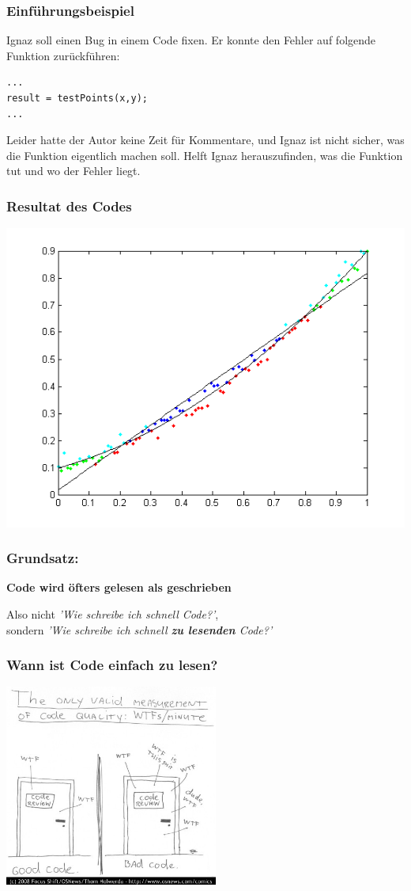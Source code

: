 \documentclass[handout]{beamer}
\begin{document}
\begin{frame}[fragile]
    \frametitle{Einführungsbeispiel}
    Ignaz soll einen Bug in einem Code fixen. Er konnte den Fehler auf folgende
    Funktion zurückführen:
\begin{lstlisting}
...
result = testPoints(x,y);
...
\end{lstlisting}
Leider hatte der Autor keine Zeit für Kommentare, und Ignaz ist nicht sicher,
was die Funktion eigentlich machen soll. Helft Ignaz herauszufinden,
was die Funktion  tut und wo der Fehler liegt.
\end{frame}

\begin{frame}
    \frametitle{Resultat des Codes}
    \begin{center}
        \includegraphics[width=0.8\linewidth]{GrafikResultat.png}
    \end{center}
\end{frame}


\begin{frame}
    \frametitle{Grundsatz:}
    \begin{center}
        \huge \bf Code wird öfters gelesen als geschrieben
    \end{center}
    \vspace{2em}\pause
    Also nicht \textit{'Wie schreibe ich schnell Code?'}, \\
    sondern \textit{'Wie schreibe ich schnell \textbf{zu lesenden} Code?'}
\end{frame}

\begin{frame}
    \frametitle{Wann ist Code einfach zu lesen?}
    \begin{center}
        \includegraphics[width=7cm]{wtfm.jpg}
    \end{center}
\end{frame}
\end{document}
